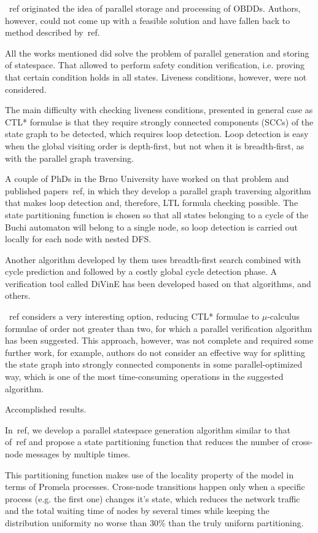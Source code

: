\begin{table}
~ref originated the idea of parallel storage and processing of OBDDs. Authors, however,
could not come up with a feasible solution and have fallen back to method described
by~ref.

All the works mentioned did solve the problem of parallel generation and storing of
statespace. That allowed to perform safety condition verification, i.e. proving that
certain condition holds in all states. Liveness conditions, however, were not considered.

The main difficulty with checking liveness conditions, presented in general case as CTL*
formulae is that they require strongly connected components (SCCs) of the state graph to
be detected, which requires loop detection. Loop detection is easy when the global
visiting order is depth-first, but not when it is breadth-first, as with the parallel
graph traversing.

A couple of PhDs in the Brno University have worked on that problem and published
papers~ref, in which they develop a parallel graph traversing algorithm that makes loop
detection and, therefore, LTL formula checking possible. The state partitioning function
is chosen so that all states belonging to a cycle of the Buchi automaton will belong to a
single node, so loop detection is carried out locally for each node with nested DFS. 

Another algorithm developed by them uses breadth-first search combined with cycle
prediction and followed by a costly global cycle detection phase. A verification tool
called DiVinE has been developed based on that algorithms, and others.

~ref considers a very interesting option, reducing CTL* formulae to $\mu$-calculus formulae
of order not greater than two, for which a parallel verification algorithm has been
suggested. This approach, however, was not complete and required some further work, for
example, authors do not consider an effective way for splitting the state graph into
strongly connected components in some parallel-optimized way, which is one of the most
time-consuming operations in the suggested algorithm.

Accomplished results.

In~ref, we develop a parallel statespace generation algorithm similar to that of~ref and
propose a state partitioning function that reduces the number of cross-node messages by
multiple times.

This partitioning function makes use of the locality property of the model in terms of
Promela processes. Cross-node transitions happen only when a specific process (e.g. the
first one) changes it's state, which reduces the network traffic and the total waiting
time of nodes by several times while keeping the distribution uniformity no worse than
30\% than the truly uniform partitioning.


\end{table}
